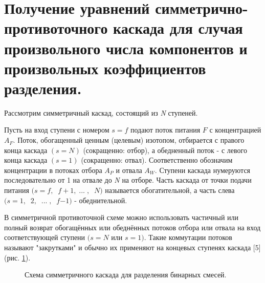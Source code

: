 

\section{Получение уравнений симметрично-противоточного каскада для случая произвольного числа компонентов и произвольных коэффициентов разделения.}

Рассмотрим симметричный каскад, состоящий из \textit{N} ступеней. 

Пусть на вход ступени с номером $s=f$ подают поток питания $F$ с концентрацией $A_{F} $. Поток, обогащенный ценным (целевым) изотопом, отбирается с правого конца каскада $(s=N)$ (сокращенно: отбор), а обедненный поток - с левого конца каскада $(s=1)$ (сокращенно: отвал). Соответственно обозначим концентрации в потоках отбора $A_{P} $ и отвала $A_{W} $. Ступени каскада нумеруются последовательно от 1 на отвале до \textit{N} на отборе. Часть каскада от точки подачи питания $(s=f,\; \; f+1,\; { ...}\; {,}\; \; {N)}$ называется обогатительной, а часть слева $(s=1,\; \; 2,\; \; {...}\; {,}\; \; f{ -1)}$ - обеднительной.

В симметричной противоточной схеме можно использовать частичный или полный возврат обогащённых или обеднённых потоков отбора или отвала на вход соответствующей ступени $(s=N$ или $s=1)$. Такие коммутации потоков называют "закрутками" и обычно их применяют на концевых ступенях каскада [5] (рис. \ref{loop}).

\begin{figure}[ht]
  \caption{Схема симметричного каскада для разделения бинарных смесей.}\label{loop}
\end{figure}

